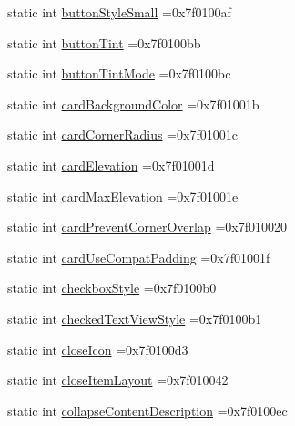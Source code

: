 \begin{DoxyCompactItemize}
static int \hyperlink{classandroid_1_1support_1_1v7_1_1cardview_1_1R_1_1attr_aee51161a62b9b1906e052f4465a89580}{button\+Style\+Small} =0x7f0100af
\item 
static int \hyperlink{classandroid_1_1support_1_1v7_1_1cardview_1_1R_1_1attr_a0db1503d1c599ba43238d88c132063e7}{button\+Tint} =0x7f0100bb
\item 
static int \hyperlink{classandroid_1_1support_1_1v7_1_1cardview_1_1R_1_1attr_afeaf294e11b1d7a013c71a69de1adf7b}{button\+Tint\+Mode} =0x7f0100bc
\item 
static int \hyperlink{classandroid_1_1support_1_1v7_1_1cardview_1_1R_1_1attr_ac0ef6047144c1884ba9c7e9d77f6f1ae}{card\+Background\+Color} =0x7f01001b
\item 
static int \hyperlink{classandroid_1_1support_1_1v7_1_1cardview_1_1R_1_1attr_a6d39a018270a4e6fe065c3ba400817ad}{card\+Corner\+Radius} =0x7f01001c
\item 
static int \hyperlink{classandroid_1_1support_1_1v7_1_1cardview_1_1R_1_1attr_aee945e311bc98e30cd1e2812a35a3d55}{card\+Elevation} =0x7f01001d
\item 
static int \hyperlink{classandroid_1_1support_1_1v7_1_1cardview_1_1R_1_1attr_a2176e51c58a1dfdee83e66e3f956d643}{card\+Max\+Elevation} =0x7f01001e
\item 
static int \hyperlink{classandroid_1_1support_1_1v7_1_1cardview_1_1R_1_1attr_af7e885084b6d221680d4118f1ead1764}{card\+Prevent\+Corner\+Overlap} =0x7f010020
\item 
static int \hyperlink{classandroid_1_1support_1_1v7_1_1cardview_1_1R_1_1attr_a213091aa6628fdf49f3b5c0428bd03de}{card\+Use\+Compat\+Padding} =0x7f01001f
\item 
static int \hyperlink{classandroid_1_1support_1_1v7_1_1cardview_1_1R_1_1attr_a7af958624cb74038f99dd3a6e7a9594f}{checkbox\+Style} =0x7f0100b0
\item 
static int \hyperlink{classandroid_1_1support_1_1v7_1_1cardview_1_1R_1_1attr_a217d182107bfc99ee474dcddb89ab962}{checked\+Text\+View\+Style} =0x7f0100b1
\item 
static int \hyperlink{classandroid_1_1support_1_1v7_1_1cardview_1_1R_1_1attr_a84d3fd2c43e781b002e7e4fe6d7d7d9d}{close\+Icon} =0x7f0100d3
\item 
static int \hyperlink{classandroid_1_1support_1_1v7_1_1cardview_1_1R_1_1attr_af057b1e89a0d6c09f35f4832a983abfa}{close\+Item\+Layout} =0x7f010042
\item 
static int \hyperlink{classandroid_1_1support_1_1v7_1_1cardview_1_1R_1_1attr_a63ef16088f42dd2933387645ad902d1a}{collapse\+Content\+Description} =0x7f0100ec

\end{DoxyCompactItemize}
